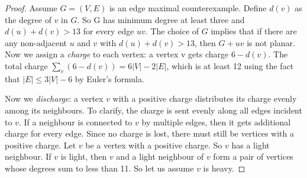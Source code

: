 \documentclass{article}
\newcommand{\0}{\mathbb{0}}
\newcommand{\1}{\mathbb{1}}
\begin{document}
\begin{proof}
 Assume $ G=(V,E)$ is an edge maximal counterexample. Define  $d(v)$ as the degree of $v$ in $G$. So G has minimum degree at least three and $d(u)+d(v) > 13$  for every edge $uv$. The choice of $G$ implies that if there are any non-adjacent $u$ and $v$ with $d(u)+d(v)>13$, then $G+uv$ is not planar. Now we assign a \emph{charge} to each vertex: a vertex v gets charge $6-d(v)$. The total charge $\sum_v (6-d(v)) = 6|V| -2|E| $, which is at least 12 using the fact that $|E| \leq 3|V|- 6$ by Euler's formula.
 
  Now we \emph{discharge}: a vertex $v$ with a positive charge distributes its charge evenly among its neighbours. To clarify, the charge is sent evenly along all edges incident to $v$. If a neighbour is connected to $v$ by multiple edges, then it gets additional charge for every edge. Since no charge is lost, there must still be vertices with a positive charge. Let $v$ be a vertex with a positive charge. So $v$ has a light neighbour. If $v$ is light, then $v$ and  a light neighbour of $v$ form a pair of vertices whose degrees sum to less than 11. So let us assume $v$ is heavy.
  

\end{proof}
\end{document}

